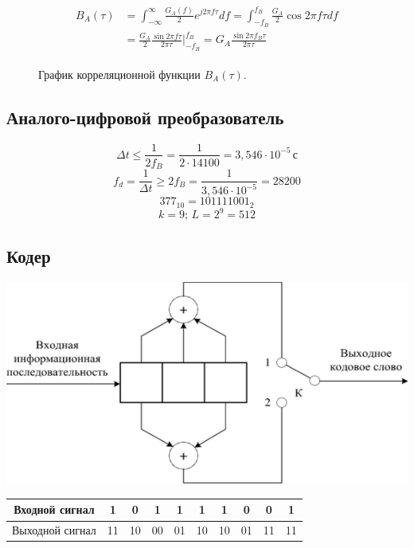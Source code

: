 \documentclass[a4paper, 12pt]{article}
\begin{document}
\begin{enumerate}
  \begin{align*}\begin{split}
    B_A(\tau)&=\int^\infty_{-\infty}\frac{G_A(f)}{2}e^{j2\pi f\tau}df
    =\int^{f_B}_{-f_B}\frac{G_A}{2}\cos{2\pi f\tau}df\\
    &=\frac{G_A}2 \frac{\sin{2\pi f \tau}}{2\pi \tau}\Biggr|^{f_B}_{-f_B} 
    =G_A\frac{\sin{2\pi f_B \tau}}{2\pi\tau}
  \end{split}\end{align*}
  \begin{figure}[H]
    \centering
    \caption{График корреляционной функции $B_A(\tau)$.}
    \label{fig:coorel_plot}
  \end{figure}
\end{enumerate}

\subsection{Аналого-цифровой преобразователь}
\[ \Delta t \leq \frac{1}{2f_B}=\frac1 {2\cdot 14100} = 3,546\cdot 10^{-5}\, с \]
\[ f_d=\frac{1}{\Delta t}\geq 2f_B=\frac{1}{3,546\cdot 10^{-5}}=28200 \]
\[ 377_{10}=101111001_2 \]
\[ k=9;\, L=2^9 = 512 \]

\subsection{Кодер}
\begin{center}
  \includegraphics[scale=0.8]{coder}

  \begin{tabular}{ | c | c | c | c | c | c | c | c | c | c | }
    \hline
    Входной сигнал &1&0&1&1&1&1&0&0&1\\
    \hline
    Выходной сигнал &11&10&00&01&10&10&01&11&11\\
    \hline
  \end{tabular}
\end{center}
\end{document}

